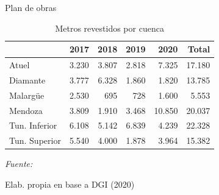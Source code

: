 \documentclass{beamer}\usepackage[]{graphicx}\usepackage[]{color}
\newenvironment{knitrout}{}{} %
\begin{document}
\begin{frame}{Plan de obras}
\begin{knitrout}
\color{fgcolor}\begin{table}[H]

\caption{\label{tab:Revestimiento}\label{Revestimiento}Metros revestidos por cuenca}
\centering
\fontsize{10}{12}\selectfont
\begin{threeparttable}
\begin{tabular}[t]{llrrrr}
\toprule
  & 2017 & 2018 & 2019 & 2020 & Total\\
\midrule
Atuel & 3.230 & 3.807 & 2.818 & 7.325 & 17.180\\
Diamante & 3.777 & 6.328 & 1.860 & 1.820 & 13.785\\
Malargüe & 2.530 & 695 & 728 & 1.600 & 5.553\\
Mendoza & 3.809 & 1.910 & 3.468 & 10.850 & 20.037\\
Tun. Inferior & 6.108 & 5.142 & 6.839 & 4.239 & 22.328\\
\addlinespace
Tun. Superior & 5.540 & 4.000 & 1.878 & 3.964 & 15.382\\
\bottomrule
\end{tabular}
\begin{tablenotes}[para]
\item \textit{Fuente: } 
\item Elab. propia en base a DGI (2020)
\end{tablenotes}
\end{threeparttable}
\end{table}


\end{knitrout}




\end{frame}
\end{document}
